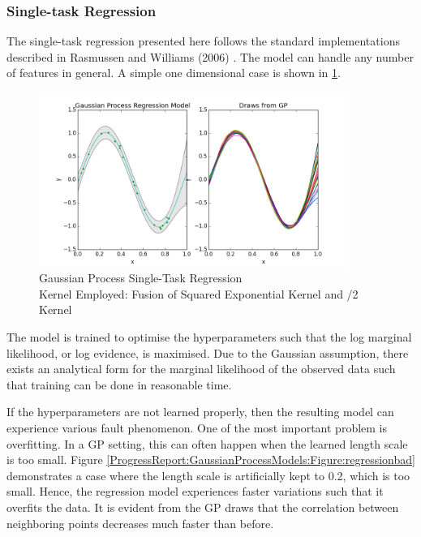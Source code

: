 			\subsubsection{Single-task Regression}
			
				The single-task regression presented here follows the standard implementations described in Rasmussen and Williams (2006) \cite{GaussianProcessForMachineLearning}. The model can handle any number of features in general. A simple one dimensional case is shown in \cref{ProgressReport:GaussianProcessModels:Figure:regression}.
				
				\begin{figure}[!htbp]
					\centering
						\includegraphics[width=0.9\textwidth]{Figures/Progress/regression.png}
					\caption{Gaussian Process Single-Task Regression \\
					Kernel Employed: Fusion of Squared Exponential Kernel and /2 Kernel}
					\label{ProgressReport:GaussianProcessModels:Figure:regression}
				\end{figure}
						
				\FloatBarrier
				
				The model is trained to optimise the hyperparameters such that the log marginal likelihood, or log evidence, is maximised. Due to the Gaussian assumption, there exists an analytical form for the marginal likelihood of the observed data such that training can be done in reasonable time.
				
				If the hyperparameters are not learned properly, then the resulting model can experience various fault phenomenon. One of the most important problem is overfitting. In a GP setting, this can often happen when the learned length scale is too small. Figure \ref{ProgressReport:GaussianProcessModels:Figure:regressionbad} demonstrates a case where the length scale is artificially kept to 0.2, which is too small. Hence, the regression model experiences faster variations such that it overfits the data. It is evident from the GP draws that the correlation between neighboring points decreases much faster than before.
					
